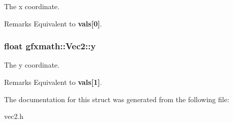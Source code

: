 The x coordinate. 

\begin{DoxyRemark}{Remarks}
Equivalent to {\bfseries vals\mbox{[}0\mbox{]}}. 
\end{DoxyRemark}
\hypertarget{structgfxmath_1_1_vec2_acfad5fd06cb37b0e0e5373f286e7d474}{}
\subsubsection[{y}]{\setlength{\rightskip}{0pt plus 5cm}float gfxmath\+::\+Vec2\+::y}\label{structgfxmath_1_1_vec2_acfad5fd06cb37b0e0e5373f286e7d474}


The y coordinate. 

\begin{DoxyRemark}{Remarks}
Equivalent to {\bfseries vals\mbox{[}1\mbox{]}}. 
\end{DoxyRemark}


The documentation for this struct was generated from the following file\+:\begin{DoxyCompactItemize}
\item 
vec2.\+h\end{DoxyCompactItemize}

